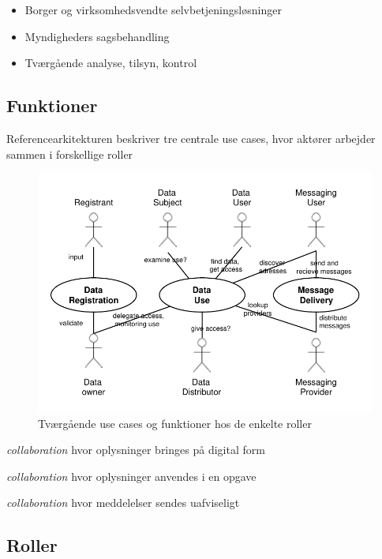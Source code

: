\begin{itemize}
\tightlist
\item
  Borger og virksomhedsvendte selvbetjeningsløsninger
\item
  Myndigheders sagsbehandling
\item
  Tværgående analyse, tilsyn, kontrol
\end{itemize}

\subsection{Funktioner}\label{funktioner}

Referencearkitekturen beskriver tre centrale use cases, hvor aktører
arbejder sammen i forskellige roller

\begin{figure}
\centering
\includegraphics{usecases.pdf}
\caption{Tværgående use cases og funktioner hos de enkelte roller}
\end{figure}

\begin{description}
\tightlist
\item[Registrering]
\emph{collaboration} hvor oplysninger bringes på digital form
\item[Datanvendelse]
\emph{collaboration} hvor oplysninger anvendes i en opgave
\item[Registreret forsendelse]
\emph{collaboration} hvor meddelelser sendes uafviseligt
\end{description}

\subsection{Roller}\label{roller}

